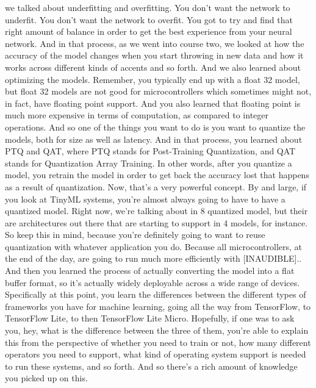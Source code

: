     we talked about underfitting and overfitting.
    You don't want the network to underfit.
    You don't want the network to overfit.
    You got to try and find that right amount of balance
    in order to get the best experience from your neural network.
    And in that process, as we went into course two,
    we looked at how the accuracy of the model
    changes when you start throwing in new data
    and how it works across different kinds of accents and so forth.
    And we also learned about optimizing the models.
    Remember, you typically end up with a float 32 model,
    but float 32 models are not good for microcontrollers
    which sometimes might not, in fact, have floating point support.
    And you also learned that floating point is much more expensive
    in terms of computation, as compared to integer operations.
    And so one of the things you want to do is
    you want to quantize the models, both for size as well as latency.
    And in that process, you learned about PTQ and QAT,
    where PTQ stands for Post-Training Quantization,
    and QAT stands for Quantization Array Training.
    In other words, after you quantize a model,
    you retrain the model in order to get back the accuracy lost that
    happens as a result of quantization.
    Now, that's a very powerful concept.
    By and large, if you look at TinyML systems,
    you're almost always going to have to have a quantized model.
    Right now, we're talking about in 8 quantized model,
    but their are architectures out there that are starting
    to support in 4 models, for instance.
    So keep this in mind, because you're definitely
    going to want to reuse quantization with whatever application you do.
    Because all microcontrollers, at the end of the day,
    are going to run much more efficiently with [INAUDIBLE]..
    And then you learned the process of actually converting
    the model into a flat buffer format, so it's actually
    widely deployable across a wide range of devices.
    Specifically at this point, you learn the differences
    between the different types of frameworks you
    have for machine learning, going all the way
    from TensorFlow, to TensorFlow Lite, to then TensorFlow Lite Micro.
    Hopefully, if one was to ask you, hey, what
    is the difference between the three of them,
    you're able to explain this from the perspective of whether you
    need to train or not, how many different operators you need to support,
    what kind of operating system support is needed to run these systems,
    and so forth.
    And so there's a rich amount of knowledge you picked up on this.
